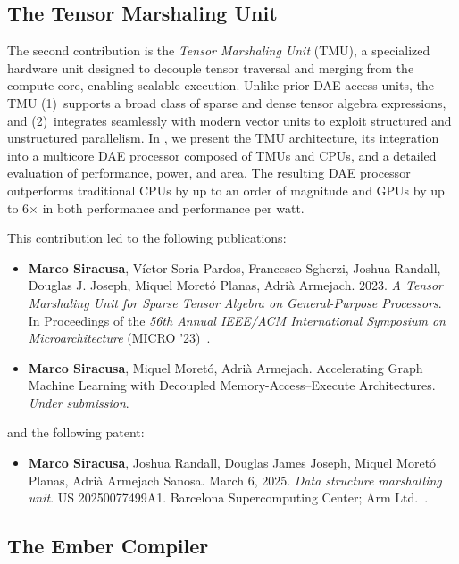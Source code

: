 \subsection{The Tensor Marshaling Unit} \label{sec:introduction-tmu}

The second contribution is the \emph{Tensor Marshaling Unit} (TMU), a specialized hardware unit designed to decouple tensor traversal and merging from the compute core, enabling scalable execution. Unlike prior DAE access units, the TMU (1)~supports a broad class of sparse and dense tensor algebra expressions, and (2)~integrates seamlessly with modern vector units to exploit structured and unstructured parallelism. In , we present the TMU architecture, its integration into a multicore DAE processor composed of TMUs and CPUs, and a detailed evaluation of performance, power, and area. The resulting DAE processor outperforms traditional CPUs by up to an order of magnitude and GPUs by up to 6$\times$ in both performance and performance per watt.

This contribution led to the following publications:
\begin{itemize}
    \item \textbf{Marco Siracusa}, Víctor Soria-Pardos, Francesco Sgherzi, Joshua Randall, Douglas J. Joseph, Miquel Moretó Planas, Adrià Armejach. 2023. \textit{A Tensor Marshaling Unit for Sparse Tensor Algebra on General-Purpose Processors}. In Proceedings of the \textit{56th Annual IEEE/ACM International Symposium on Microarchitecture} (MICRO '23)~\cite{siracusa2023micro}.
    \item \textbf{Marco Siracusa}, Miquel Moretó, Adrià Armejach. Accelerating Graph Machine Learning with Decoupled Memory-Access--Execute Architectures. \textit{Under submission}.

\end{itemize}
and the following patent:
\begin{itemize}
    \item \textbf{Marco Siracusa}, Joshua Randall, Douglas James Joseph, Miquel Moretó Planas, Adrià Armejach Sanosa. March 6, 2025. \textit{Data structure marshalling unit}. US 20250077499A1. Barcelona Supercomputing Center; Arm Ltd.~\cite{siracusa2025patent}.
\end{itemize}

\subsection{The Ember Compiler} \label{sec:introduction-ember}

